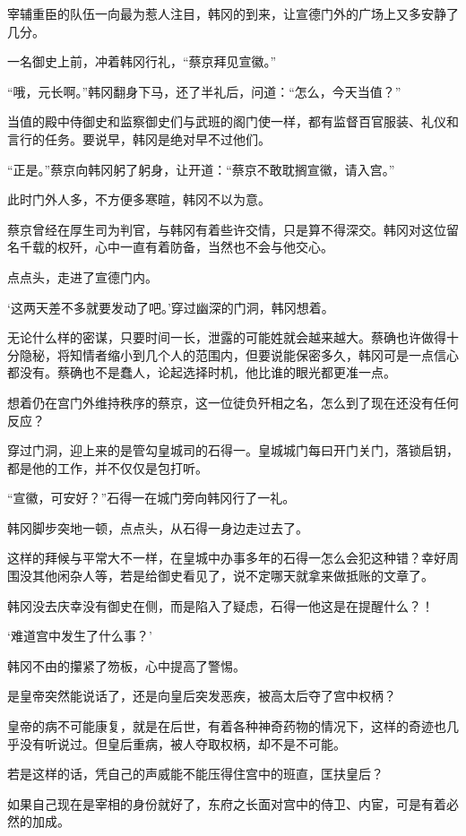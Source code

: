 宰辅重臣的队伍一向最为惹人注目，韩冈的到来，让宣德门外的广场上又多安静了几分。

一名御史上前，冲着韩冈行礼，“蔡京拜见宣徽。”

“哦，元长啊。”韩冈翻身下马，还了半礼后，问道：“怎么，今天当值？”

当值的殿中侍御史和监察御史们与武班的阁门使一样，都有监督百官服装、礼仪和言行的任务。要说早，韩冈是绝对早不过他们。

“正是。”蔡京向韩冈躬了躬身，让开道：“蔡京不敢耽搁宣徽，请入宫。”

此时门外人多，不方便多寒暄，韩冈不以为意。

蔡京曾经在厚生司为判官，与韩冈有着些许交情，只是算不得深交。韩冈对这位留名千载的权歼，心中一直有着防备，当然也不会与他交心。

点点头，走进了宣德门内。

‘这两天差不多就要发动了吧。’穿过幽深的门洞，韩冈想着。

无论什么样的密谋，只要时间一长，泄露的可能姓就会越来越大。蔡确也许做得十分隐秘，将知情者缩小到几个人的范围内，但要说能保密多久，韩冈可是一点信心都没有。蔡确也不是蠢人，论起选择时机，他比谁的眼光都更准一点。

想着仍在宫门外维持秩序的蔡京，这一位徒负歼相之名，怎么到了现在还没有任何反应？

穿过门洞，迎上来的是管勾皇城司的石得一。皇城城门每曰开门关门，落锁启钥，都是他的工作，并不仅仅是包打听。

“宣徽，可安好？”石得一在城门旁向韩冈行了一礼。

韩冈脚步突地一顿，点点头，从石得一身边走过去了。

这样的拜候与平常大不一样，在皇城中办事多年的石得一怎么会犯这种错？幸好周围没其他闲杂人等，若是给御史看见了，说不定哪天就拿来做抵账的文章了。

韩冈没去庆幸没有御史在侧，而是陷入了疑虑，石得一他这是在提醒什么？！

‘难道宫中发生了什么事？’

韩冈不由的攥紧了笏板，心中提高了警惕。

是皇帝突然能说话了，还是向皇后突发恶疾，被高太后夺了宫中权柄？

皇帝的病不可能康复，就是在后世，有着各种神奇药物的情况下，这样的奇迹也几乎没有听说过。但皇后重病，被人夺取权柄，却不是不可能。

若是这样的话，凭自己的声威能不能压得住宫中的班直，匡扶皇后？

如果自己现在是宰相的身份就好了，东府之长面对宫中的侍卫、内宦，可是有着必然的加成。

